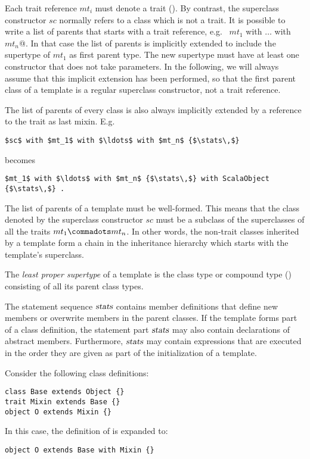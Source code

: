 Each trait reference $mt_i$ must denote a trait ().
By contrast, the superclass constructor $sc$ normally refers to a
class which is not a trait. It is possible to write a list of
parents that starts with a trait reference, e.g.
~\lstinline@$mt_1$ with $\ldots$ with $mt_n$@. In that case the list
of parents is implicitly extended to include the supertype of $mt_1$
as first parent type. The new supertype must have at least one
constructor that does not take parameters.  In the following, we will
always assume that this implicit extension has been performed, so that
the first parent class of a template is a regular superclass
constructor, not a trait reference.

The list of parents of every class is also always implicitly extended
by a reference to the  trait as last
mixin. E.g.\
\begin{lstlisting}
$sc$ with $mt_1$ with $\ldots$ with $mt_n$ {$\stats\,$}
\end{lstlisting}
becomes
\begin{lstlisting}
$mt_1$ with $\ldots$ with $mt_n$ {$\stats\,$} with ScalaObject {$\stats\,$} .
\end{lstlisting}

The list of parents of a template must be well-formed. This means that
the class denoted by the superclass constructor $sc$ must be a
subclass of the superclasses of all the traits $mt_1 \commadots mt_n$.
In other words, the non-trait classes inherited by a template form a
chain in the inheritance hierarchy which starts with the template's
superclass.

The {\em least proper supertype} of a template is the class type or
compound type (\sref{sec:compound-types}) consisting of all its parent
class types. 

The statement sequence $\mbox{\sl stats}$ contains member definitions that
define new members or overwrite members in the parent classes.  If the
template forms part of a class definition, the statement part $\mbox{\sl stats}$
may also contain declarations of abstract members. Furthermore,
$\mbox{\sl stats}$ may contain expressions that are executed in the order they
are given as part of the initialization of a template.


\example Consider the following class definitions:

\begin{lstlisting}
class Base extends Object {}
trait Mixin extends Base {}
object O extends Mixin {}
\end{lstlisting}
In this case, the definition of  is expanded to:
\begin{lstlisting}
object O extends Base with Mixin {}
\end{lstlisting}

